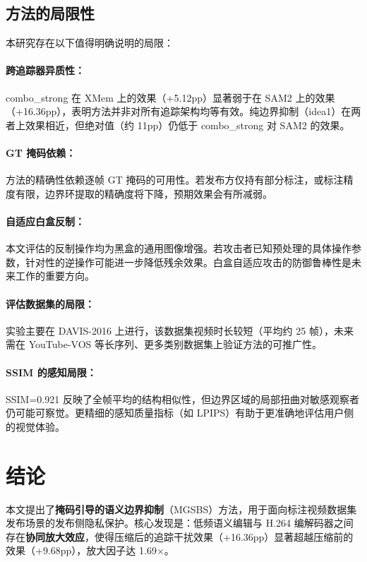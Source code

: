 \documentclass[UTF8,a4paper,12pt]{ctexart}
\begin{document}
\subsection{方法的局限性}

本研究存在以下值得明确说明的局限：

\paragraph{跨追踪器异质性：}combo\_strong 在 XMem 上的效果（+5.12pp）显著弱于在 SAM2 上的效果（+16.36pp），表明方法并非对所有追踪架构均等有效。纯边界抑制（idea1）在两者上效果相近，但绝对值（约 11pp）仍低于 combo\_strong 对 SAM2 的效果。

\paragraph{GT 掩码依赖：}方法的精确性依赖逐帧 GT 掩码的可用性。若发布方仅持有部分标注，或标注精度有限，边界环提取的精确度将下降，预期效果会有所减弱。

\paragraph{自适应白盒反制：}本文评估的反制操作均为黑盒的通用图像增强。若攻击者已知预处理的具体操作参数，针对性的逆操作可能进一步降低残余效果。白盒自适应攻击的防御鲁棒性是未来工作的重要方向。

\paragraph{评估数据集的局限：}实验主要在 DAVIS-2016 上进行，该数据集视频时长较短（平均约 25 帧），未来需在 YouTube-VOS 等长序列、更多类别数据集上验证方法的可推广性。

\paragraph{SSIM 的感知局限：}SSIM=0.921 反映了全帧平均的结构相似性，但边界区域的局部扭曲对敏感观察者仍可能可察觉。更精细的感知质量指标（如 LPIPS）有助于更准确地评估用户侧的视觉体验。

\section{结论}
\label{sec:conclusion}

本文提出了\textbf{掩码引导的语义边界抑制}（MGSBS）方法，用于面向标注视频数据集发布场景的发布侧隐私保护。核心发现是：低频语义编辑与 H.264 编解码器之间存在\textbf{协同放大效应}，使得压缩后的追踪干扰效果（+16.36pp）显著超越压缩前的效果（+9.68pp），放大因子达 1.69×。
\end{document}
